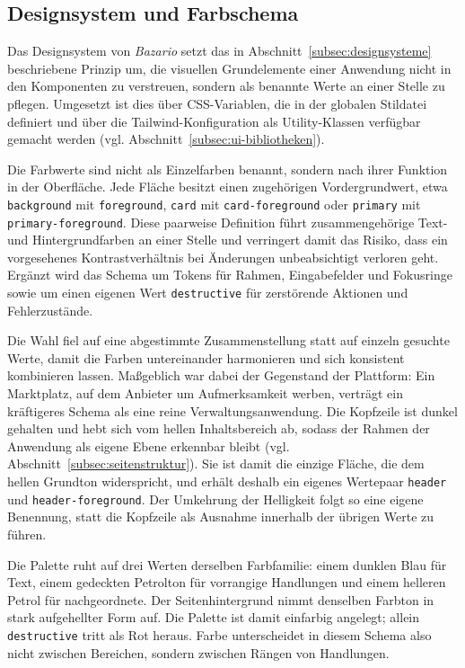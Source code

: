 \subsection{Designsystem und Farbschema}
\label{subsec:designsystem}

Das Designsystem von \textit{Bazario} setzt das in
Abschnitt~\ref{subsec:designsysteme} beschriebene Prinzip um, die
visuellen Grundelemente einer Anwendung nicht in den Komponenten zu
verstreuen, sondern als benannte Werte an einer Stelle zu pflegen.
Umgesetzt ist dies über \acs{CSS}-Variablen, die in der globalen
Stildatei definiert und über die Tailwind-Konfiguration als
Utility-Klassen verfügbar gemacht werden (vgl.
Abschnitt~\ref{subsec:ui-bibliotheken}).

Die Farbwerte sind nicht als Einzelfarben benannt, sondern nach ihrer
Funktion in der Oberfläche. Jede Fläche besitzt einen zugehörigen
Vordergrundwert, etwa \texttt{background} mit \texttt{foreground},
\texttt{card} mit \texttt{card-foreground} oder \texttt{primary} mit
\texttt{primary-foreground}. Diese paarweise Definition führt zusammengehörige Text- und
Hintergrundfarben an einer Stelle und verringert damit das Risiko,
dass ein vorgesehenes Kontrastverhältnis bei Änderungen unbeabsichtigt
verloren geht. Ergänzt wird das Schema um Tokens für
Rahmen, Eingabefelder und Fokusringe sowie um einen eigenen Wert
\texttt{destructive} für zerstörende Aktionen und Fehlerzustände.

Die Wahl fiel auf eine abgestimmte Zusammenstellung statt auf einzeln
gesuchte Werte, damit die Farben untereinander harmonieren und sich
konsistent kombinieren lassen. Maßgeblich war dabei der
Gegenstand der Plattform: Ein Marktplatz, auf dem Anbieter um
Aufmerksamkeit werben, verträgt ein kräftigeres Schema als eine reine
Verwaltungsanwendung. Die Kopfzeile ist dunkel gehalten und hebt sich
vom hellen Inhaltsbereich ab, sodass der Rahmen der Anwendung als
eigene Ebene erkennbar bleibt (vgl.
Abschnitt~\ref{subsec:seitenstruktur}). Sie ist damit die einzige
Fläche, die dem hellen Grundton widerspricht, und erhält deshalb ein
eigenes Wertepaar \texttt{header} und \texttt{header-foreground}. Der
Umkehrung der Helligkeit folgt so eine eigene Benennung, statt die
Kopfzeile als Ausnahme innerhalb der übrigen Werte zu führen.

Die Palette ruht auf drei Werten derselben Farbfamilie: einem dunklen
Blau für Text, einem gedeckten Petrolton für vorrangige
Handlungen und einem helleren Petrol für nachgeordnete. Der
Seitenhintergrund nimmt denselben Farbton in stark aufgehellter Form
auf. Die Palette ist damit einfarbig angelegt; allein
\texttt{destructive} tritt als Rot heraus. Farbe unterscheidet in
diesem Schema also nicht zwischen Bereichen, sondern zwischen Rängen
von Handlungen.


